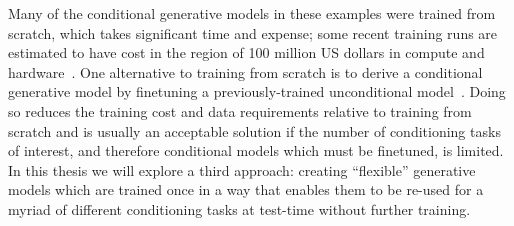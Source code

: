 Many of the conditional generative models in these examples were trained from scratch, which takes significant time and expense; some recent training runs are estimated to have cost in the region of 100 million US dollars in compute and hardware~\citep{knight2023openai,stanford2024artificial}. One alternative to training from scratch is to derive a conditional generative model by finetuning a previously-trained unconditional model~\citep{tian2023control,sheynin2023emu}. Doing so reduces the training cost and data requirements relative to training from scratch and is usually an acceptable solution if the number of conditioning tasks of interest, and therefore conditional models which must be finetuned, is limited. In this thesis we will explore a third approach: creating ``flexible'' generative models which are trained once in a way that enables them to be re-used for a myriad of different conditioning tasks at test-time without further training.

